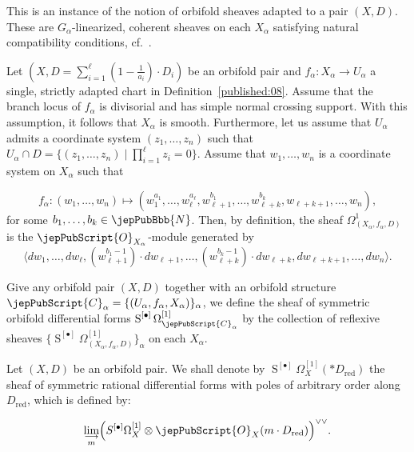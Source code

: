 \begin{remark}
This is an instance of the notion of orbifold sheaves adapted to a pair $(X,D)$.
These are $G_{\alpha}$-linearized, coherent sheaves on each $X_{\alpha}$
satisfying natural compatibility conditions, cf.~\cite[Sect.~2.6]{pubref15}.
\end{remark}

\begin{example}\label{published:11}
Let $(X, D =\sum_{i=1}^\ell (1-\frac{1}{a_i})\cdot D_i)$ be an orbifold pair and $f_{\alpha}: X_{\alpha}\to U_{\alpha}$ 
 a single, strictly adapted chart in Definition~\ref{published:08}.
Assume that the branch locus of $f_{\alpha}$ is divisorial and has simple normal crossing support. 
With this assumption, it follows 
that $X_{\alpha}$ is smooth. 
Furthermore, let us assume that $U_{\alpha}$ admits a coordinate system $(z_1, \ldots, z_n)$
such that $U_{\alpha}\cap D = \{ (z_1, \ldots, z_n) \; \big| \;  \prod_{i=1}^\ell z_i =0   \}$.
Assume that $w_1, \ldots , w_n$ is a coordinate system on $X_{\alpha}$ such that 

\begin{equation} \label{published:12}
f_{\alpha}: (w_1, \ldots, w_n) \mapsto (w_1^{a_1} , \ldots, w_\ell^{a_\ell}, w_{\ell+1}^{b_1}, \ldots, w_{\ell+k}^{b_k},
w_{\ell+k+1}, \ldots, w_n),
\end{equation}
for some $b_1, \ldots, b_k \in \jepPubBbb{N}$.
Then, by definition, the sheaf $\Omega^1_{(X_{\alpha}, f_{\alpha}, D )}$
is the $\jepPubScript{O}_{X_{\alpha}}$-module generated by 
$$
\langle    dw_1  , \ldots, dw_\ell,  (w^{b_1-1}_{\ell+1})\cdot dw_{\ell+1}, \ldots, (w^{b_k-1}_{\ell+k})\cdot dw_{\ell+k}, 
dw_{\ell+k+1}, \ldots, dw_n \rangle. 
$$

\end{example}

\begin{definition}
Give any orbifold pair $(X,D)$ together with an orbifold structure 
$\jepPubScript{C}_{\alpha} =  \{ (U_{\alpha}, f_{\alpha}, X_{\alpha}) \}_{\alpha}$, 
we define the sheaf of symmetric orbifold differential forms $\operatorname{S}^{[\bullet]} \Omega^{[1]}_{\jepPubScript{C}_{\alpha}}$
by the collection of reflexive sheaves $\{ \operatorname{S}^{[\bullet]} \Omega^{[1]}_{(X_{\alpha}, f_{\alpha}, D)}  \}_{\alpha}$
on each $X_{\alpha}$.

\end{definition}

\begin{notation}
Let $(X,D)$ be an orbifold pair. We shall denote by $\operatorname{S}^{[\bullet]}\Omega^{[1]}_X(*  D_{\operatorname{red}})$
the sheaf of symmetric rational differential forms with poles of arbitrary order along $D_{\operatorname{red}}$,
which is defined by:

$$
\lim_{\substack{\longrightarrow\\ m}} \Bigl(S^{[\bullet]} \Omega_X^{[1]} \otimes \jepPubScript{O}_X(m\cdot D_{\operatorname{red}}) \Big)^{\vee\vee}.
$$

\end{notation}

